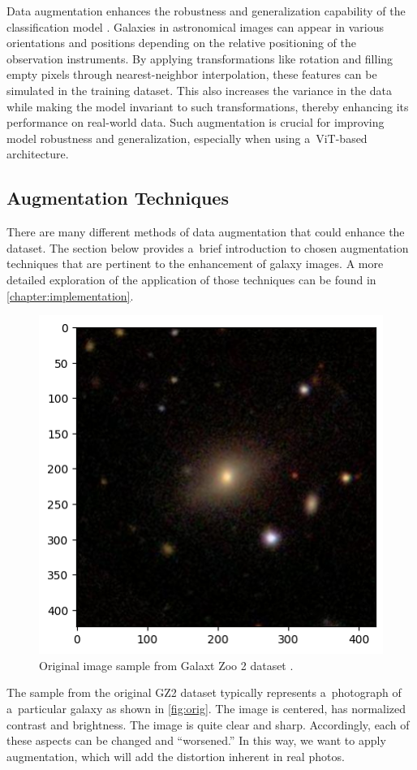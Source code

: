 Data augmentation enhances the robustness and generalization capability of the classification model \cite{ayyadevara2024modern}. Galaxies in astronomical images can appear in various orientations and positions depending on the relative positioning of the observation instruments. By applying transformations like rotation and filling empty pixels through nearest-neighbor interpolation, these features can be simulated in the training dataset. This also increases the variance in the data while making the model invariant to such transformations, thereby enhancing its performance on real-world data. Such augmentation is crucial for improving model robustness and generalization, especially when using a~ViT-based architecture.

\subsection*{Augmentation Techniques}
\label{sec:augmentation-tech}

There are many different methods of data augmentation that could enhance the dataset. The section below provides a~brief introduction to chosen augmentation techniques that are pertinent to the enhancement of galaxy images. A more detailed exploration of the application of those techniques can be found in \autoref{chapter:implementation}.

\medskip


\begin{figure}[htbp]\centering
  \centering
  \includegraphics[width=0.6\linewidth]{obrazky-figures/03-dataset/orig.png}
  \caption{Original image sample from Galaxt Zoo 2 dataset \cite{Willett_2013}.}
  \label{fig:orig}
\end{figure}

The sample from the original GZ2 dataset typically represents a~photograph of a~particular galaxy as shown in \autoref{fig:orig}. The image is centered, has normalized contrast and brightness. The image is quite clear and sharp. Accordingly, each of these aspects can be changed and \enquote{worsened.} In this way, we want to apply augmentation, which will add the distortion inherent in real photos.

